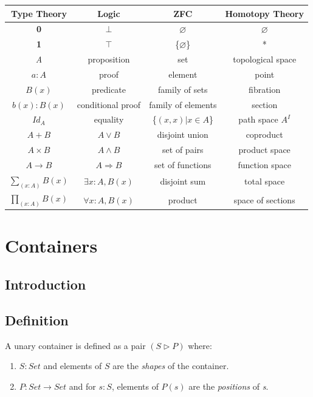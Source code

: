 \documentclass[12pt]{report}
\begin{document}
\begin{center}
\begin{tabular}{| c | c | c | c |}
\hline
\textbf{Type Theory} & \textbf{Logic} & \textbf{ZFC} & \textbf{Homotopy Theory}\\
\hline
\textbf{0} & $\bot$ & $\varnothing$ &$\varnothing$\\
\textbf{1} & $\top$ & \{$\varnothing$\} &*\\
\textit{A} & proposition & set & topological space\\
$a : A$ & proof & element & point\\
$B(x)$ & predicate & family of sets & fibration\\
$b(x) : B(x)$ & conditional proof & family of elements & section\\
$ Id_A $ & equality & \{$ (x,x) | x \in A $\} & path space $A^{\textit{I}}$\\
$A + B$ & $A \vee B$ & disjoint union & coproduct\\
$ A \times B$ & $A \wedge B$ & set of pairs & product space\\
$A \rightarrow B$ & $A \Rightarrow B$ & set of functions & function space\\
$ \sum_{(x:A)}^{} B(x) $ & $\exists x:A, B(x) $ & disjoint sum & total space\\
$ \prod_{(x:A)}^{} B(x) $ & $\forall x:A, B(x) $ & product & space of sections\\
\hline
\end{tabular}
\end{center}


\chapter{Containers}
\section{Introduction}
\section{Definition}
A unary container is defined as a pair $ (S \rhd P) $ where:
\begin{enumerate}
\item $S : Set$ and elements of $S$ are the \textit{shapes} of the container.
\item $P : Set \to Set$ and for $s : S$, elements of $P(s)$ are the \textit{positions} of \textit{s}.
\end{enumerate}
\end{document}
